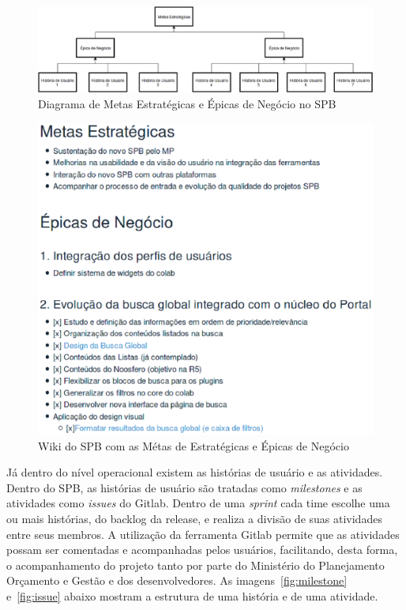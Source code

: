 \newpage
\begin{figure}[h]
    \centering
        \includegraphics[keepaspectratio=true,scale=0.3]{figuras/epics-diagram.eps}
    \caption{Diagrama de Metas Estratégicas e Épicas de Negócio no SPB}
    \label{fig:epics-diagram}
\end{figure}

\begin{figure}[h]
    \centering
        \includegraphics[keepaspectratio=true,scale=0.5]{figuras/wiki.eps}
    \caption{Wiki do SPB com as Métas de Estratégicas e Épicas de Negócio}
    \label{fig:epics-wiki}
\end{figure}

Já dentro do nível operacional existem as histórias de usuário e as atividades.
Dentro do SPB, as histórias de usuário são tratadas como \textit{milestones} 
e as atividades como \textit{issues} do Gitlab. Dentro de uma \textit{sprint}
cada time escolhe uma ou mais  histórias, do backlog da release, e realiza a divisão
de suas atividades entre seus membros. A utilização da ferramenta Gitlab permite
que as atividades possam ser comentadas e acompanhadas pelos usuários, facilitando,
desta forma, o acompanhamento do projeto tanto por parte do Ministério do Planejamento
Orçamento e Gestão e dos desenvolvedores. As imagens~\ref{fig:milestone} e~\ref{fig:issue}
abaixo mostram a estrutura de uma história e de uma atividade.

